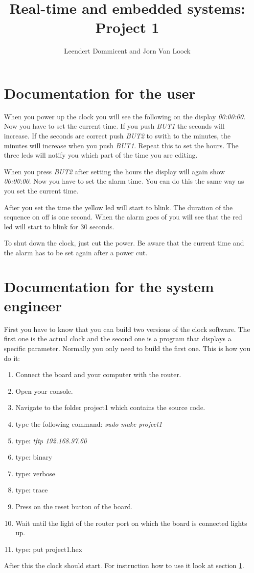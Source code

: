 \documentclass[a4]{article}
\title{Real-time and embedded systems: Project 1}
\author{Leendert Dommicent and Jorn Van Loock}
\begin{document}
\maketitle
\setlength{\parindent}{0px}
\setlength{\parskip}{8px}
\section{Documentation for the user}
\label{sec:user}
When you power up the clock you will see the following on the display \textit{00:00:00}. Now you have to set the current time. If you push \textit{BUT1} the seconds will increase. If the seconds are correct push \textit{BUT2} to swith to the minutes, the minutes will increase when you push \textit{BUT1}. Repeat this to set the hours. The three leds will notify you which part of the time you are editing.\par
When you press \textit{BUT2} after setting the hours the display will again show \textit{00:00:00}. Now you have to set the alarm time. You can do this the same way as you set the current time. \par
After you set the time the yellow led will start to blink. The duration of the sequence on off is one second. When the alarm goes of you will see that the red led will start to blink for 30 seconds.\par
To shut down the clock, just cut the power. Be aware that the current time and the alarm has to be set again after a power cut.
\section{Documentation for the system engineer}
\label{sec:engineer}
First you have to know that you can build two versions of the clock software. The first one is the actual clock and the second one is a program that displays a specific parameter. Normally you only need to build the first one. This is how you do it:
\begin{enumerate}
\item Connect the board and your computer with the router.
\item Open your console.
\item Navigate to the folder project1 which contains the source code.
\item type the following command: \textit{sudo make project1}
\label{itm:command}
\item type: \textit{tftp 192.168.97.60}
\item type: binary
\item type: verbose
\item type: trace
\item Press on the reset button of the board.
\item Wait until the light of the router port on which the board is connected lights up.
\item type: put project1.hex
\end{enumerate}
After this the clock should start. For instruction how to use it look at section \ref{sec:user}.
\end{document}
